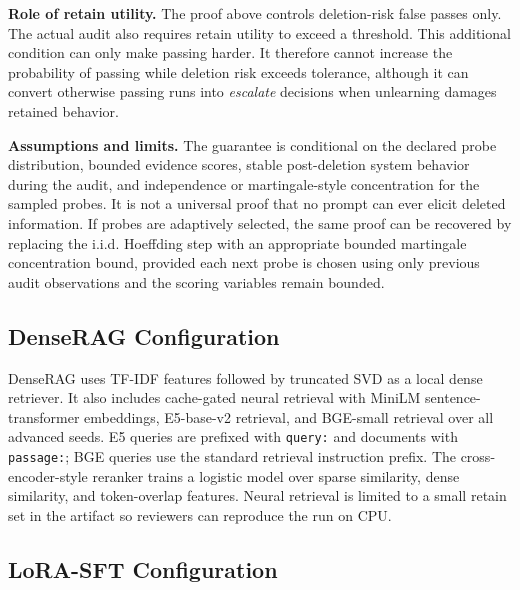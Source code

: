 \documentclass[10pt,journal,compsoc]{IEEEtran}
\begin{document}
\textbf{Role of retain utility.}
The proof above controls deletion-risk false passes only. The actual audit also requires retain utility to exceed a threshold. This additional condition can only make passing harder. It therefore cannot increase the probability of passing while deletion risk exceeds tolerance, although it can convert otherwise passing runs into \emph{escalate} decisions when unlearning damages retained behavior.

\textbf{Assumptions and limits.}
The guarantee is conditional on the declared probe distribution, bounded evidence scores, stable post-deletion system behavior during the audit, and independence or martingale-style concentration for the sampled probes. It is not a universal proof that no prompt can ever elicit deleted information. If probes are adaptively selected, the same proof can be recovered by replacing the i.i.d. Hoeffding step with an appropriate bounded martingale concentration bound, provided each next probe is chosen using only previous audit observations and the scoring variables remain bounded.

\subsection{DenseRAG Configuration}

DenseRAG uses TF-IDF features followed by truncated SVD as a local dense retriever. It also includes cache-gated neural retrieval with MiniLM sentence-transformer embeddings, E5-base-v2 retrieval, and BGE-small retrieval over all advanced seeds. E5 queries are prefixed with \texttt{query:} and documents with \texttt{passage:}; BGE queries use the standard retrieval instruction prefix. The cross-encoder-style reranker trains a logistic model over sparse similarity, dense similarity, and token-overlap features. Neural retrieval is limited to a small retain set in the artifact so reviewers can reproduce the run on CPU.

\subsection{LoRA-SFT Configuration}
\end{document}
